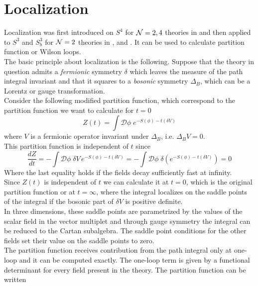 \section{Localization}
Localization was first introduced on $S^4$ for $\mathcal{N}=2,4$ theories in \cite{Pestun:2007rz} and then applied to $S^3$ and $S_b^3$ for $\mathcal{N}=2$ theories in \cite{Kapustin:2009kz}, \cite{Hama:2010av} and \cite{Hama:2011ea}.
It can be used to calculate partition function or Wilson loops. \\
The basic principle about localization is the following.
Suppose that the theory in question admits a \emph{fermionic} symmetry $\delta$ which leaves the measure of the path integral invariant and that it squares to a \emph{bosonic} symmetry $\Delta_B$, which can be a Lorentz or gauge transformation.\\
Consider the following modified partition function, which correspond to the partition function we want to calculate for $t=0$
\begin{equation}
Z(t) = \int \mathcal{D} \phi \; e^{- S(\phi) - t (\delta V)}
\end{equation}
where $V$ is a fermionic operator invariant under $\Delta_B$, i.e. $ \Delta_B V = 0$.\\
This partition function is independent of $t$ since
\begin{equation}
 \frac{d Z}{d t} = - \int \mathcal{D} \phi \; \delta V \, e^{- S(\phi) - t (\delta V)} =  - \int  \mathcal{D} \phi \; \delta \left( e^{- S(\phi) - t (\delta V)  }\right) = 0
\end{equation}
Where the last equality holds if the fields decay sufficiently fast at infinity.\\
Since $Z(t)$ is independent of $t$ we can calculate it at $t=0$, which is the original partition function or at $t=\infty$, where the integral localizes on the saddle points of the integral if the bosonic part of $\delta V$ is positive definite.\\
In three dimensions, these saddle points are parametrized by the values of the scalar field in the vector multiplet and through gauge symmetry the integral can be reduced to the Cartan subalgebra. 
The saddle point conditions for the other fields set their value on the saddle points to zero.\\
The partition function receives contribution from the path integral only at one-loop and it can be computed exactly.
The one-loop term is given by a functional determinant for every field present in the theory.
The partition function can be written 

